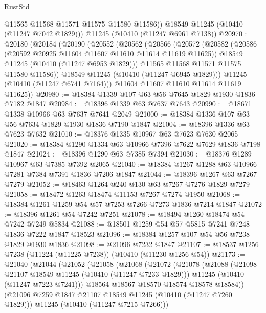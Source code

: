 \begin{lexlean}{RustStd}
\begin{coremodule}
          @11565
          @11568
          @11571
          @11575
          @11580
          @11586))
      @18549
      @11245
      (@10410 (@11247 @7042 @1829)))
    @11245
    (@10410 (@11247 @6961 @7138))
@20970 := @20180
    (@20184
      (@20190
        (@20552
          (@20562
            (@20566
              (@20572
                (@20582
                  (@20586 (@20592 @20925 @11604 @11607 @11610 @11614 @11619 @11625))
                  @18549
                  @11245
                  (@10410 (@11247 @6953 @1829)))
                @11565
                @11568
                @11571
                @11575
                @11580
                @11586))
            @18549
            @11245
            (@10410 (@11247 @6945 @1829)))
          @11245
          (@10410 (@11247 @6741 @7164)))
        @11604
        @11607
        @11610
        @11614
        @11619
        @11625))
@20980 := @18384 @1339 @107 @63 @56 @7645 @1829 @1930 @1836 @7182 @1847
@20984 := @18396 @1339 @63 @7637 @7643
@20990 := @18671 @1338 @10966 @63 @7637 @7641 @2049
@21000 := @18384 @1336 @107 @63 @56 @7634 @1829 @1930 @1836 @7190 @1847
@21004 := @18396 @1336 @63 @7623 @7632
@21010 := @18376 @1335 @10967 @63 @7623 @7630 @2065
@21020 := @18384 @1290 @1334 @63 @10966 @7396 @7622 @7629 @1836 @7198 @1847
@21024 := @18396 @1290 @63 @7385 @7394
@21030 := @18376 @1289 @10967 @63 @7385 @7392 @2065
@21040 := @18384 @1267 @1288 @63 @10966 @7281 @7384 @7391 @1836 @7206 @1847
@21044 := @18396 @1267 @63 @7267 @7279
@21052 := @18463 @1264 @240 @130 @63 @7267 @7276 @1829 @7279
@21058 := @18472 @1263 @18474 @11153 @7267 @7274 @1950
@21068 := @18384 @1261 @1259 @54 @57 @7253 @7266 @7273 @1836 @7214 @1847
@21072 := @18396 @1261 @54 @7242 @7251
@21078 := @18494 @1260 @18474 @54 @7242 @7249 @5834
@21088 := @18501 @1259 @54 @57 @5815 @7241 @7248 @1836 @7222 @1847 @18523
@21096 := @18384 @1257 @107 @54 @56 @7238 @1829 @1930 @1836
@21098 := @21096 @7232 @1847
@21107 := @18537 @1256 @7238 (@11224 (@11225 @7238)) (@10410 (@11230 @1256 @54))
@21173 := @21040
    (@21044
      (@21052
        (@21058
          (@21068
            (@21072
              (@21078
                (@21088
                  (@21098 @21107 @18549 @11245 (@10410 (@11247 @7233 @1829)))
                  @11245
                  (@10410 (@11247 @7223 @7241)))
                @18564
                @18567
                @18570
                @18574
                @18578
                @18584))
            (@21096 @7259 @1847 @21107 @18549 @11245 (@10410 (@11247 @7260 @1829)))
            @11245
            (@10410 (@11247 @7215 @7266)))

\end{coremodule}
\end{lexlean}
